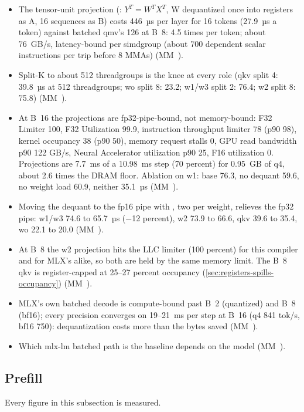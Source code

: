 \begin{itemize}
\item The tensor-unit projection (: $Y^{T} = W^{T} X^{T}$, W dequantized once into registers as A, 16 sequences as B)
  costs 446~µs per layer for 16 tokens (27.9~µs a token) against batched qmv's 126 at B~8: 4.5 times per token; about
  76~GB/s, latency-bound per simdgroup (about 700 dependent scalar instructions per trip before 8 MMAs) (MM~).
\item Split-K to about 512 threadgroups is the knee at every role (qkv split 4: 39.8~µs at 512 threadgroups; wo split 8:
  23.2; w1/w3 split 2: 76.4; w2 split 8: 75.8) (MM~).
\item At B~16 the projections are fp32-pipe-bound, not memory-bound: F32 Limiter 100, F32 Utilization 99.9, instruction
  throughput limiter 78 (p90 98), kernel occupancy 38 (p90 50), memory request stalls 0, GPU read bandwidth p90 122
  GB/s, Neural Accelerator utilization p90 25, F16 utilization 0. Projections are 7.7~ms of a 10.98~ms step (70
  percent) for 0.95~GB of q4, about 2.6 times the DRAM floor. Ablation on w1: base 76.3, no dequant 59.6, no weight
  load 60.9, neither 35.1~µs (MM~).
\item Moving the dequant to the fp16 pipe with , two per weight, relieves the fp32 pipe:
  w1/w3 74.6 to 65.7~µs (−12 percent), w2 73.9 to 66.6, qkv 39.6 to 35.4, wo 22.1 to 20.0 (MM~).
\item At B~8 the w2 projection hits the LLC limiter (100 percent) for this compiler and for MLX's 
  alike, so both are held by the same memory limit. The B~8 qkv is register-capped at 25–27 percent occupancy (\cref{sec:registers-spills-occupancy}) (MM~).
\item MLX's own batched decode is compute-bound past B~2 (quantized) and B~8 (bf16); every precision converges on 19–21~ms
  per step at B~16 (q4 841 tok/s, bf16 750): dequantization costs more than the bytes saved (MM~).
\item Which mlx-lm batched path is the baseline depends on the model (MM~).
\end{itemize}

\subsection*{Prefill}

Every figure in this subsection is measured.

